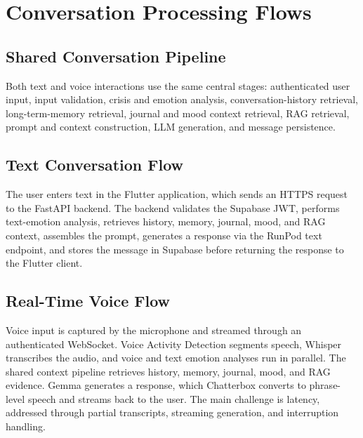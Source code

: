 \documentclass[12pt,a4paper,oneside,openany]{report}
\begin{document}
\section{Conversation Processing Flows}

\subsection{Shared Conversation Pipeline}

Both text and voice interactions use the same central stages: authenticated user input, input validation, crisis and emotion analysis, conversation-history retrieval, long-term-memory retrieval, journal and mood context retrieval, RAG retrieval, prompt and context construction, LLM generation, and message persistence.

\subsection{Text Conversation Flow}

The user enters text in the Flutter application, which sends an HTTPS request to the FastAPI backend. The backend validates the Supabase JWT, performs text-emotion analysis, retrieves history, memory, journal, mood, and RAG context, assembles the prompt, generates a response via the RunPod text endpoint, and stores the message in Supabase before returning the response to the Flutter client.

\subsection{Real-Time Voice Flow}

Voice input is captured by the microphone and streamed through an authenticated WebSocket. Voice Activity Detection segments speech, Whisper transcribes the audio, and voice and text emotion analyses run in parallel. The shared context pipeline retrieves history, memory, journal, mood, and RAG evidence. Gemma generates a response, which Chatterbox converts to phrase-level speech and streams back to the user. The main challenge is latency, addressed through partial transcripts, streaming generation, and interruption handling.
\end{document}
